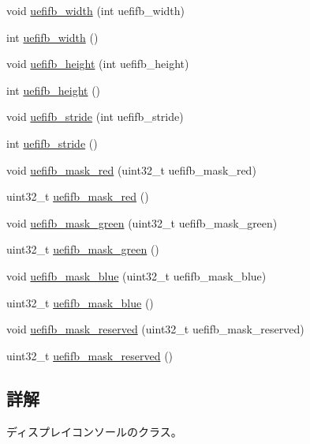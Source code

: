 \begin{DoxyCompactItemize}
\item 
void \hyperlink{classdisplay__console_af3e64f62827bab683e73c8c2937bd061}{uefifb\+\_\+width} (int uefifb\+\_\+width)
\item 
int \hyperlink{classdisplay__console_a9842b9adc744d7be6cb4beebc357ded4}{uefifb\+\_\+width} ()
\item 
void \hyperlink{classdisplay__console_aabd6aa8ac978e0f9e3c6f6b3c9b9d806}{uefifb\+\_\+height} (int uefifb\+\_\+height)
\item 
int \hyperlink{classdisplay__console_afec1cad7f92d03a020a4a2140bcd3ee9}{uefifb\+\_\+height} ()
\item 
void \hyperlink{classdisplay__console_ab2c385da00eaa8481fc5f0ea1160783b}{uefifb\+\_\+stride} (int uefifb\+\_\+stride)
\item 
int \hyperlink{classdisplay__console_aacd72b116774e3d9cb02a364cda9b1b9}{uefifb\+\_\+stride} ()
\item 
void \hyperlink{classdisplay__console_ae9aa4a1e7451bf5714123631010bf32c}{uefifb\+\_\+mask\+\_\+red} (uint32\+\_\+t uefifb\+\_\+mask\+\_\+red)
\item 
uint32\+\_\+t \hyperlink{classdisplay__console_af31bb334255868e64ecffb392057216f}{uefifb\+\_\+mask\+\_\+red} ()
\item 
void \hyperlink{classdisplay__console_af343b289cbb2c9dfd4ab3851ab0586a3}{uefifb\+\_\+mask\+\_\+green} (uint32\+\_\+t uefifb\+\_\+mask\+\_\+green)
\item 
uint32\+\_\+t \hyperlink{classdisplay__console_a8ca8cb1d5dd1f15a000cd8a6be9c80f5}{uefifb\+\_\+mask\+\_\+green} ()
\item 
void \hyperlink{classdisplay__console_a64a0fe72df84541a22009e5abc2619bc}{uefifb\+\_\+mask\+\_\+blue} (uint32\+\_\+t uefifb\+\_\+mask\+\_\+blue)
\item 
uint32\+\_\+t \hyperlink{classdisplay__console_a0a8c7d6ade4cf363f29f404ab3749290}{uefifb\+\_\+mask\+\_\+blue} ()
\item 
void \hyperlink{classdisplay__console_adc561d3a6e6a32d27407dd94b3e9173b}{uefifb\+\_\+mask\+\_\+reserved} (uint32\+\_\+t uefifb\+\_\+mask\+\_\+reserved)
\item 
uint32\+\_\+t \hyperlink{classdisplay__console_a0b8ca02c6a0ea909732ec813bcc8b8a7}{uefifb\+\_\+mask\+\_\+reserved} ()
\end{DoxyCompactItemize}


\subsection{詳解}
ディスプレイコンソールのクラス。 

